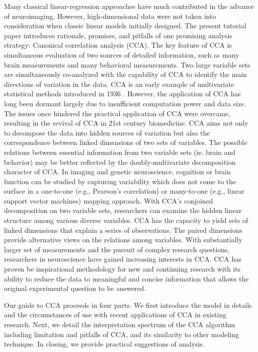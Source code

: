 Many classical linear-regression approaches have much contributed in the advance of neuroimaging. However, high-dimensional data were not taken into consideration when classic linear models initially designed. The present tutorial paper introduces rationale, promises, and pitfalls of one promising analysis strategy: Canonical correlation analysis (CCA). The key feature of CCA is simultaneous evaluation of two sources of detailed information, such as many brain measurements and many behavioral measurements. Two large variable sets are simultaneously co-analyzed with the capability of CCA to identify the main directions of variation in the data. CCA is an early example of multivariate statistical methods introduced in 1936 \cite{Hotelling1936}. However, the application of CCA has long been dormant largely due to insufficient computation power and data size. The issues once hindered the practical application of CCA were overcame, resulting in the revival of CCA in 21st century biomedicine. CCA aims not only to decompose the data into hidden sources of variation but also the correspondence between linked dimensions of two sets of variables. The possible relations between essential information from two variable sets (ie. brain and behavior) may be better reflected by the doubly-multivariate decomposition character of CCA.  In imaging and genetic neuroscience, cognition or brain function can be studied by capturing variability which does not come to the surface in a one-to-one (e.g., Pearson's correlation) or many-to-one (e.g., linear support vector machines) mapping approach. With CCA's conjoined decomposition on two variable sets, researchers can examine the hidden linear structure among various diverse variables. CCA has the capacity to yield sets of linked dimensions that explain a series of observations. The paired dimensions provide alternative views on the relations among variables. With substantially larger set of measurements and the pursuit of complex research questions, researchers in neuroscience have gained increasing interests in CCA. CCA has proven be inspirational methodology for new and continuing research \cite{Marquand2017, Smith2015,Tsvetanov2016,VatanseverNI2017,WangPsychScience2018,WangPsychScience2018} with its ability to reduce the data to meaningful and concise information that allows the original experimental question to be answered. 

Our guide to CCA proceeds in four parts. We first introduce the model in details and the circumstances of use with recent applications of CCA in existing research. Next, we detail the interpretation spectrum of the CCA algorithm including limitation and pitfalls of CCA, and its similarity to other modeling technique. In closing, we provide practical suggestions of analysis.

